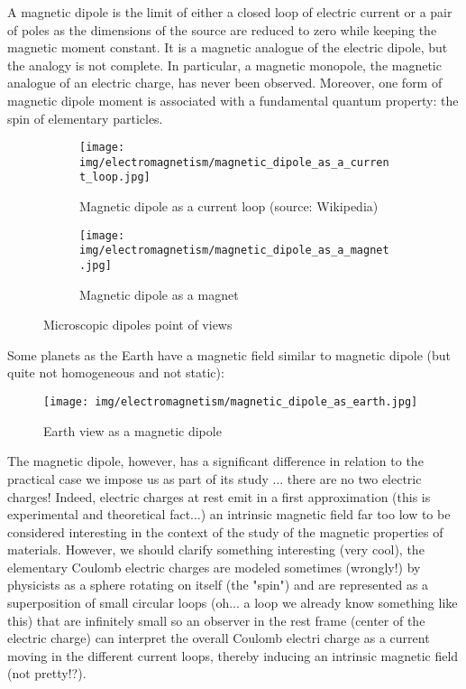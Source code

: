 	A magnetic dipole is the limit of either a closed loop of electric current or a pair of poles as the dimensions of the source are reduced to zero while keeping the magnetic moment constant. It is a magnetic analogue of the electric dipole, but the analogy is not complete. In particular, a magnetic monopole, the magnetic analogue of an electric charge, has never been observed. Moreover, one form of magnetic dipole moment is associated with a fundamental quantum property: the spin of elementary particles.
	\begin{figure}[H]
	\centering
	\begin{subfigure}{.5\textwidth}
	  \centering
	  \texttt{[image: img/electromagnetism/magnetic\_dipole\_as\_a\_current\_loop.jpg]}
	  \caption{Magnetic dipole as a current loop (source: Wikipedia)}
	\end{subfigure}
	\begin{subfigure}{.5\textwidth}
	  \centering
	  \texttt{[image: img/electromagnetism/magnetic\_dipole\_as\_a\_magnet.jpg]}
	  \caption{Magnetic dipole as a magnet}
	\end{subfigure}
	\caption{Microscopic dipoles point of views}
	\end{figure}
	Some planets as the Earth have a magnetic field similar to magnetic dipole (but quite not homogeneous and not static):
	\begin{figure}[H]
		\centering
		\texttt{[image: img/electromagnetism/magnetic\_dipole\_as\_earth.jpg]}
		\caption{Earth view as a magnetic dipole}
	\end{figure}
	
	The magnetic dipole, however, has a significant difference in relation to the practical case we impose us as part of its study ... there are no two electric charges! Indeed, electric charges at rest emit in a first approximation (this is experimental and theoretical fact...) an intrinsic magnetic field far too low to be considered interesting in the context of the study of the magnetic properties of materials. However, we should clarify something interesting (very cool), the elementary Coulomb electric charges are modeled sometimes (wrongly!) by physicists as a sphere rotating on itself (the "spin") and are represented as a superposition of small circular loops (oh... a loop we already know something like this) that are infinitely small so an observer in the rest frame (center of the electric charge) can interpret the overall Coulomb electri charge as a current moving in the different current loops, thereby inducing an intrinsic magnetic field (not pretty!?).
	
